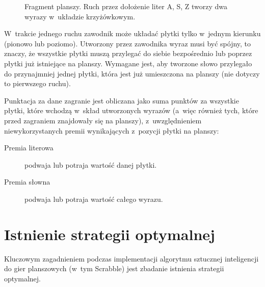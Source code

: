 \documentclass[a4paper,twocolumn,12pt]{article}
\theoremstyle{definition}
\begin{document}
\begin{figure}[ht!]
\begin{center}
		\caption{Fragment planszy. Ruch przez dołożenie liter A, S, Z tworzy dwa wyrazy w~układzie krzyżówkowym.}
		\label{fig:crossword_second}
	\end{center}
\end{figure}

W~trakcie jednego ruchu zawodnik może układać płytki tylko w~jednym kierunku (pionowo lub poziomo). Utworzony przez zawodnika wyraz musi być spójny, to znaczy, że wszystkie płytki muszą przylegać do siebie bezpośrednio lub poprzez płytki już istniejące na planszy. Wymagane jest, aby tworzone słowo przylegało do przynajmniej jednej płytki, która jest już umieszczona na planszy (nie dotyczy to pierwszego ruchu).

Punktacja za dane zagranie jest obliczana jako suma punktów za wszystkie płytki, które wchodzą w~skład utworzonych wyrazów (a~więc również tych, które przed zagraniem znajdowały się na planszy), z~uwzględnieniem niewykorzystanych premii wynikających z~pozycji płytki na planszy:

\begin{description}
 \item [Premia literowa] podwaja lub potraja wartość danej płytki.
 \item [Premia słowna] podwaja lub potraja wartość całego wyrazu.
\end{description}

\section*{Istnienie strategii optymalnej}

Kluczowym zagadnieniem podczas implementacji algorytmu sztucznej inteligencji do gier planszowych (w~tym Scrabble) jest zbadanie istnienia strategii optymalnej.
\end{document}
